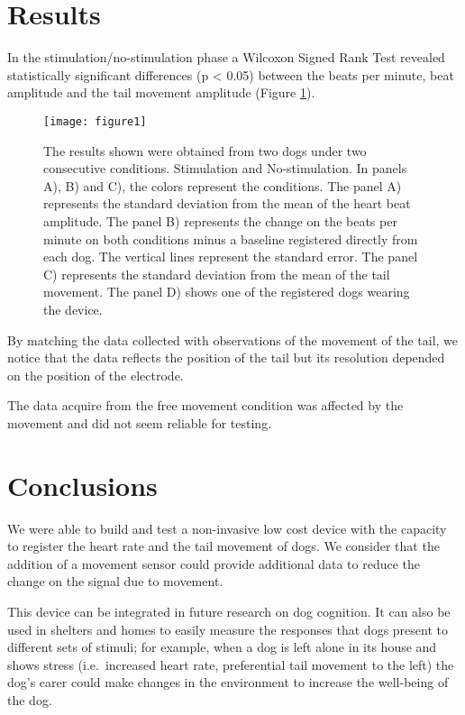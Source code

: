 \documentclass[twocolumn]{bmcart}%
\begin{document}
\section{Results}\label{results}

In the stimulation/no-stimulation phase a Wilcoxon Signed Rank Test
revealed statistically significant differences (p \textless{} 0.05)
between the beats per minute, beat amplitude and the tail movement
amplitude (Figure \ref{centfig}).

\begin{figure}[h!]
  \texttt{[image: figure1]}
  \caption{\label{centfig}
The results shown were obtained from two dogs under two consecutive conditions. Stimulation and No-stimulation. In panels A), B) and C), the colors represent the conditions. The panel A) represents the standard deviation from the mean of the heart beat amplitude. The panel B) represents the change on the beats per minute on both conditions minus a baseline registered directly from each dog. The vertical lines represent the standard error. The panel C) represents the standard deviation from the mean of the tail movement. The panel D) shows one of the registered dogs wearing the device.
}
\end{figure}

By matching the data collected with observations of the movement of the
tail, we notice that the data reflects the position of the tail but its
resolution depended on the position of the electrode.

The data acquire from the free movement condition was affected by the
movement and did not seem reliable for testing.

\section{Conclusions}\label{conclusions}

We were able to build and test a non-invasive low cost device with the
capacity to register the heart rate and the tail movement of dogs. We
consider that the addition of a movement sensor could provide additional
data to reduce the change on the signal due to movement.

This device can be integrated in future research on dog cognition. It
can also be used in shelters and homes to easily measure the responses
that dogs present to different sets of stimuli; for example, when a dog
is left alone in its house and shows stress (i.e.~increased heart rate,
preferential tail movement to the left) the dog's carer could make
changes in the environment to increase the well-being of the dog.
\end{document}
